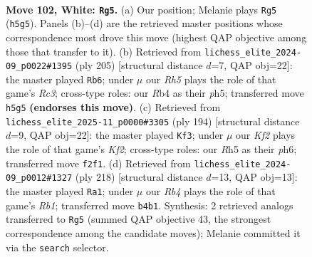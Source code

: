 \documentclass[11pt]{article}
\begin{document}
\clearpage

\begin{figure}[p]\centering
\begin{subfigure}{0.46\textwidth}\centering
\resizebox{\linewidth}{!}{%
\newchessgame
\chessboard[
  setfen={8/3k4/4p3/7R/1R2P3/r4P2/5K2/8 w - - 7 102},
  showmover=false,
  pgfstyle=straightmove, color=movearrow, markmove={h5-g5}
]}
\caption{}
\end{subfigure}\hfill
\begin{subfigure}{0.46\textwidth}\centering
\resizebox{\linewidth}{!}{%
\newchessgame
\chessboard[
  setfen={5k2/R5p1/2r4p/4P2P/4K3/8/8/8 b - - 25 103},
  showmover=false,
  pgfstyle=straightmove, color=movearrow, markmove={c6-b6}
]}
\caption{}
\end{subfigure}
\\[4pt]
\begin{subfigure}{0.46\textwidth}\centering
\resizebox{\linewidth}{!}{%
\newchessgame
\chessboard[
  setfen={6k1/6p1/7p/R6P/1r4P1/8/5K2/8 w - - 51 98},
  showmover=false,
  pgfstyle=straightmove, color=movearrow, markmove={f2-f3}
]}
\caption{}
\end{subfigure}\hfill
\begin{subfigure}{0.46\textwidth}\centering
\resizebox{\linewidth}{!}{%
\newchessgame
\chessboard[
  setfen={8/8/8/6k1/6p1/6P1/3r1PK1/1R6 w - - 2 110},
  showmover=false,
  pgfstyle=straightmove, color=movearrow, markmove={b1-a1}
]}
\caption{}
\end{subfigure}
\caption{\textbf{Move 102, White: \texttt{Rg5}.} (a) Our position; Melanie plays \texttt{Rg5} (\texttt{h5g5}). Panels (b)--(d) are the retrieved master positions whose correspondence most drove this move (highest QAP objective among those that transfer to it). (b) Retrieved from \texttt{lichess\_elite\_2024-09\_p0022\#1395} (ply 205) [structural distance $d$=7, QAP obj=22]: the master played \texttt{Rb6}; under $\mu$ our \emph{Rh5} plays the role of that game's \emph{Rc3}; cross-type roles: our \emph{R}b4 as their \emph{p}h5; transferred move \texttt{h5g5} \textbf{(endorses this move)}. (c) Retrieved from \texttt{lichess\_elite\_2025-11\_p0000\#3305} (ply 194) [structural distance $d$=9, QAP obj=22]: the master played \texttt{Kf3}; under $\mu$ our \emph{Kf2} plays the role of that game's \emph{Kf2}; cross-type roles: our \emph{R}h5 as their \emph{p}h6; transferred move \texttt{f2f1}. (d) Retrieved from \texttt{lichess\_elite\_2024-09\_p0012\#1327} (ply 218) [structural distance $d$=13, QAP obj=13]: the master played \texttt{Ra1}; under $\mu$ our \emph{Rb4} plays the role of that game's \emph{Rb1}; transferred move \texttt{b4b1}. Synthesis: 2 retrieved analogs transferred to \texttt{Rg5} (summed QAP objective 43, the strongest correspondence among the candidate moves); Melanie committed it via the \texttt{search} selector.}
\label{fig:thought-m202}
\end{figure}
\end{document}
